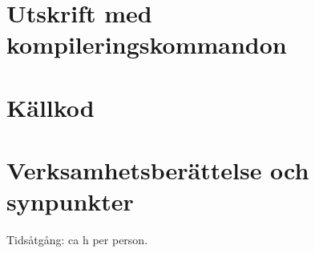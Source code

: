\documentclass[a4paper]{article}
\begin{document}
\section*{Utskrift med kompileringskommandon}
%

\section*{Källkod}
%

\section*{Verksamhetsberättelse och synpunkter}
Tidsåtgång: ca h per person.
\end{document}
